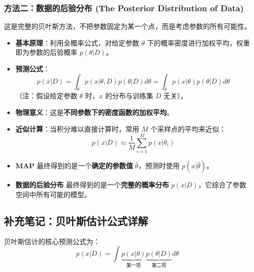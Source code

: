 \documentclass[a4paper, 11pt]{ctexart}
\begin{document}
\begin{itemize}
    \subsubsection*{方法二：数据的后验分布 (The Posterior Distribution of Data)}
    这是完整的贝叶斯方法，不把参数固定为某一个点，而是考虑参数的所有可能性。
    \begin{itemize}
        \item \textbf{基本原理}：利用全概率公式，对给定参数 $\theta$ 下的概率密度进行加权平均，权重即为参数的后验概率 $p(\theta|D)$。
        \item \textbf{预测公式}：
            \begin{equation}
                p(x|D) = \int_{\theta} p(x|\theta, D) p(\theta|D) d\theta = \int_{\theta} p(x|\theta) p(\theta|D) d\theta
            \end{equation}
        （注：假设给定参数 $\theta$ 时，$x$ 的分布与训练集 $D$ 无关）。
        \item \textbf{物理意义}：这是\textbf{不同参数下的密度函数的加权平均}。
        \item \textbf{近似计算}：当积分难以直接计算时，常用 $M$ 个采样点的平均来近似：
        \begin{equation}
            p(x|D) \approx \frac{1}{M} \sum_{i=1}^M p(x|\theta_i)
        \end{equation}
    \end{itemize}
\end{itemize}

\begin{important}[重点对比]
\begin{itemize}
    \item \textbf{MAP} 最终得到的是一个\textbf{确定的参数值} $\hat{\theta}$，预测时使用 $p(x|\hat{\theta})$。
    \item \textbf{数据的后验分布} 最终得到的是一个\textbf{完整的概率分布} $p(x|D)$，它综合了参数空间中所有可能的模型。
\end{itemize}
\end{important}
\subsection*{补充笔记：贝叶斯估计公式详解}

贝叶斯估计的核心预测公式为：
\begin{equation}
    p(x|D) = \int \underbrace{p(x|\theta)}_{\text{第一项}} \underbrace{p(\theta|D)}_{\text{第二项}} d\theta
\end{equation}
\end{document}
